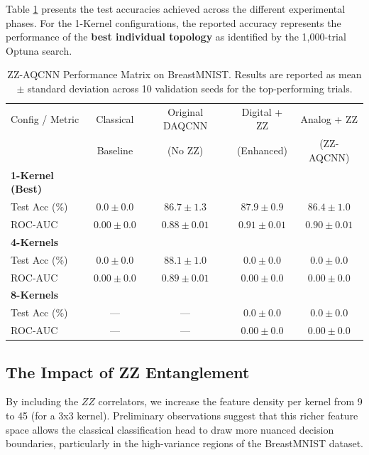 \documentclass[11pt,a4paper]{article}
\begin{document}
Table \ref{tab:main_results} presents the test accuracies achieved across the different experimental phases. For the 1-Kernel configurations, the reported accuracy represents the performance of the \textbf{best individual topology} as identified by the 1,000-trial Optuna search.

\begin{table}[htbp]
    \centering
    \caption{ZZ-AQCNN Performance Matrix on BreastMNIST. Results are reported as mean $\pm$ standard deviation across 10 validation seeds for the top-performing trials.}
    \begin{tabular}{l c c c c}
        \toprule
        Config / Metric & Classical & Original DAQCNN & Digital + ZZ & Analog + ZZ \\
                        & Baseline & (No ZZ) & (Enhanced) & (ZZ-AQCNN) \\
        \midrule
        \textbf{1-Kernel (Best)} & & & & \\
        Test Acc (\%) & $0.0 \pm 0.0$ & $86.7 \pm 1.3$ & $87.9 \pm 0.9$ & $86.4 \pm 1.0$ \\
        ROC-AUC       & $0.00 \pm 0.0$ & $0.88 \pm 0.01$ & $0.91 \pm 0.01$ & $0.90 \pm 0.01$ \\
        \midrule
        \textbf{4-Kernels} & & & & \\
        Test Acc (\%) & $0.0 \pm 0.0$ & $88.1 \pm 1.0$ & $0.0 \pm 0.0$ & $0.0 \pm 0.0$ \\
        ROC-AUC       & $0.00 \pm 0.0$ & $0.89 \pm 0.01$ & $0.00 \pm 0.0$ & $0.00 \pm 0.0$ \\
        \midrule
        \textbf{8-Kernels} & & & & \\
        Test Acc (\%) & ---   & ---   & $0.0 \pm 0.0$ & $0.0 \pm 0.0$ \\
        ROC-AUC       & ---   & ---   & $0.00 \pm 0.0$ & $0.00 \pm 0.0$ \\
        \bottomrule
    \end{tabular}
    \label{tab:main_results}
\end{table}

\subsection{The Impact of ZZ Entanglement}
By including the $ZZ$ correlators, we increase the feature density per kernel from 9 to 45 (for a 3x3 kernel). Preliminary observations suggest that this richer feature space allows the classical classification head to draw more nuanced decision boundaries, particularly in the high-variance regions of the BreastMNIST dataset.
\end{document}
